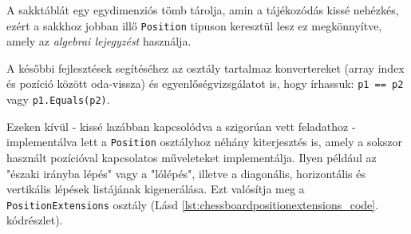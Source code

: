 \documentclass[twoside, a4paper, 12pt]{book}
\begin{document}
A sakktáblát egy egydimenziós tömb tárolja, amin a tájékozódás kissé nehézkés, ezért a sakkhoz jobban illő \texttt{Position} tipuson keresztül lesz ez megkönnyítve, amely az \textit{algebrai lejegyzést} használja.

A későbbi fejlesztések segítéséhez az osztály tartalmaz konvertereket (array index és pozíció között oda-vissza) és egyenlőségvizsgálatot is, hogy írhassuk: \texttt{p1 == p2} vagy \texttt{p1.Equals(p2)}.

Ezeken kívül - kissé lazábban kapcsolódva a szigorúan vett feladathoz - implementálva lett a \texttt{Position} osztályhoz néhány kiterjesztés is, amely a sokszor használt pozícióval kapcsolatos műveleteket implementálja. Ilyen például az "északi irányba lépés" vagy a "lólépés", illetve a diagonális, horizontális és vertikális lépések listájának kigenerálása. Ezt valósítja meg a \texttt{PositionExtensions} osztály (Lásd \ref{lst:chessboardpositionextensions_code}. kódrészlet).
\end{document}
